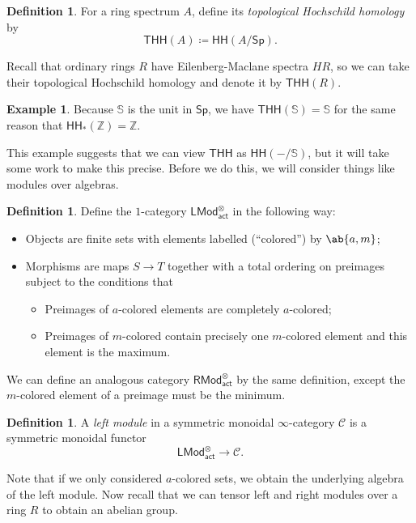 \documentclass[10pt, oneside]{memoir}
\theoremstyle{definition}
\newtheorem{defn}[thm]{Definition}
\newtheorem{exm}[thm]{Example}
\theoremstyle{remark}
\theoremstyle{plain}
\theoremstyle{definition}
\theoremstyle{remark}
\newcommand{\Z}{\mathbb{Z}}
\newcommand{\bS}{\mathbb{S}}
\newcommand{\mc}[1]{\mathcal{#1}}
\newcommand{\ms}[1]{\mathsf{#1}}
\newcommand{\1}{\mathbf{1}}
\newcommand{\2}{\mathbf{2}}
\newcommand{\3}{\mathbf{3}}
\newcommand{\THH}{\ms{THH}}
\newcommand{\HH}{\ms{HH}}
\begin{document}
\begin{defn}
    For a ring spectrum \(A \), define its \textit{topological Hochschild homology} by
    \[ \THH(A) \coloneqq \HH(A/\ms{Sp}). \]
\end{defn}

Recall that ordinary rings \(R \) have Eilenberg-Maclane spectra \(HR \), so we can take their topological Hochschild homology and denote it by \(\THH(R) \).

\begin{exm}
    Because \(\bS \) is the unit in \(\ms{Sp} \), we have \(\THH(\bS) = \bS \) for the same reason that \(\HH_*(\Z) = \Z \).
\end{exm}
This example suggests that we can view \(\THH \) as \(\HH(-/\bS) \), but it will take some work to make this precise. Before we do this, we will consider things like modules over algebras.

\begin{defn}
    Define the \(1 \)-category \(\ms{LMod}_{\ms{act}}^{\otimes} \) in the following way:
    \begin{itemize}
        \item Objects are finite sets with elements labelled (``colored'') by \(\ab\{a, m\} \);
        \item Morphisms are maps \(S \to T \) together with a total ordering on preimages subject to the conditions that
        \begin{itemize}
            \item Preimages of \(a \)-colored elements are completely \(a \)-colored;
            \item Preimages of \(m \)-colored contain precisely one \(m \)-colored element and this element is the maximum.
        \end{itemize}
    \end{itemize}
    We can define an analogous category \(\ms{RMod}^{\otimes}_{\ms{act}} \) by the same definition, except the \(m \)-colored element of a preimage must be the minimum.
\end{defn}

\begin{defn}
    A \textit{left module} in a symmetric monoidal \(\infty \)-category \(\mc{C} \) is a symmetric monoidal functor
    \[ \ms{LMod}_{\ms{act}}^{\otimes} \to \mc{C}. \]
\end{defn}

Note that if we only considered \(a \)-colored sets, we obtain the underlying algebra of the left module. Now recall that we can tensor left and right modules over a ring \(R \) to obtain an abelian group.
\end{document}
